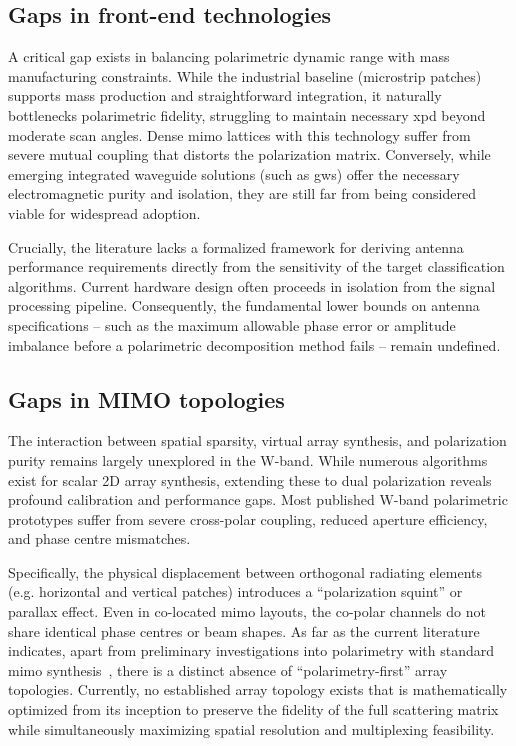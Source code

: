 \subsection{Gaps in front-end technologies}
\label{sec:gaps-frontend}

A critical gap exists in balancing polarimetric dynamic range with mass manufacturing constraints.
While the industrial baseline (microstrip patches) supports mass production and straightforward integration, it naturally bottlenecks polarimetric fidelity, struggling to maintain necessary \gls{xpd} beyond moderate scan angles.
Dense \gls{mimo} lattices with this technology suffer from severe mutual coupling that distorts the polarization matrix.
Conversely, while emerging integrated waveguide solutions (such as \glspl{gw}) offer the necessary electromagnetic purity and isolation, they are still far from being considered viable for widespread adoption.

Crucially, the literature lacks a formalized framework for deriving antenna performance requirements directly from the sensitivity of the target classification algorithms.
Current hardware design often proceeds in isolation from the signal processing pipeline.
Consequently, the fundamental lower bounds on antenna specifications -- such as the maximum allowable phase error or amplitude imbalance before a polarimetric decomposition method fails -- remain undefined.


\subsection{Gaps in MIMO topologies}
\label{sec:gaps-mimo}

The interaction between spatial sparsity, virtual array synthesis, and polarization purity remains largely unexplored in the W-band.
While numerous algorithms exist for scalar 2D array synthesis, extending these to dual polarization reveals profound calibration and performance gaps.
Most published W-band polarimetric prototypes suffer from severe cross-polar coupling, reduced aperture efficiency, and phase centre mismatches.

Specifically, the physical displacement between orthogonal radiating elements (e.g. horizontal and vertical patches) introduces a \enquote{polarization squint} or parallax effect.
Even in co-located \gls{mimo} layouts, the co-polar channels do not share identical phase centres or beam shapes.
As far as the current literature indicates, apart from preliminary investigations into polarimetry with standard \gls{mimo} synthesis~\parencite{zhaoCalibrationPolarimetricAutomotive2024}, there is a distinct absence of \enquote{polarimetry-first} array topologies.
Currently, no established array topology exists that is mathematically optimized from its inception to preserve the fidelity of the full scattering matrix while simultaneously maximizing spatial resolution and multiplexing feasibility.


